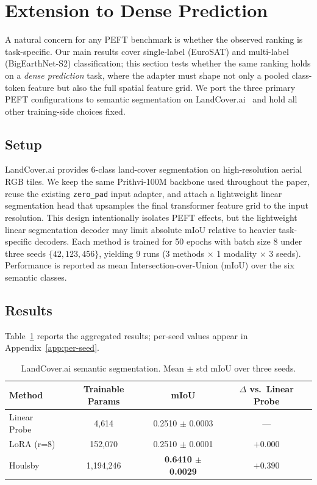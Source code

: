 \section{Extension to Dense Prediction}
\label{sec:segmentation}

A natural concern for any PEFT benchmark is whether the observed ranking is task-specific. Our main results cover single-label (EuroSAT) and multi-label (BigEarthNet-S2) classification; this section tests whether the same ranking holds on a \emph{dense prediction} task, where the adapter must shape not only a pooled class-token feature but also the full spatial feature grid. We port the three primary PEFT configurations to semantic segmentation on LandCover.ai~\cite{boguszewski2021landcoverai} and hold all other training-side choices fixed.

\subsection{Setup}

LandCover.ai provides 6-class land-cover segmentation on high-resolution aerial RGB tiles. We keep the same Prithvi-100M backbone used throughout the paper, reuse the existing \texttt{zero\_pad} input adapter, and attach a lightweight linear segmentation head that upsamples the final transformer feature grid to the input resolution. This design intentionally isolates PEFT effects, but the lightweight linear segmentation decoder may limit absolute mIoU relative to heavier task-specific decoders. Each method is trained for 50 epochs with batch size 8 under three seeds $\{42, 123, 456\}$, yielding 9 runs (3 methods $\times$ 1 modality $\times$ 3 seeds). Performance is reported as mean Intersection-over-Union (mIoU) over the six semantic classes.

\subsection{Results}

Table~\ref{tab:landcoverai-seg} reports the aggregated results; per-seed values appear in Appendix~\ref{app:per-seed}.

\begin{table}[h]
\centering
\small
\caption{LandCover.ai semantic segmentation. Mean $\pm$ std mIoU over three seeds.}
\label{tab:landcoverai-seg}
\begin{tabular}{lccc}
\toprule
Method & Trainable Params & mIoU & $\Delta$ vs.\ Linear Probe \\
\midrule
Linear Probe & 4{,}614       & 0.2510 $\pm$ 0.0003 & --- \\
LoRA (r=8)   & 152{,}070     & 0.2510 $\pm$ 0.0001 & $+0.000$ \\
Houlsby      & 1{,}194{,}246 & \textbf{0.6410 $\pm$ 0.0029} & $\mathbf{+0.390}$ \\
\bottomrule
\end{tabular}
\end{table}

